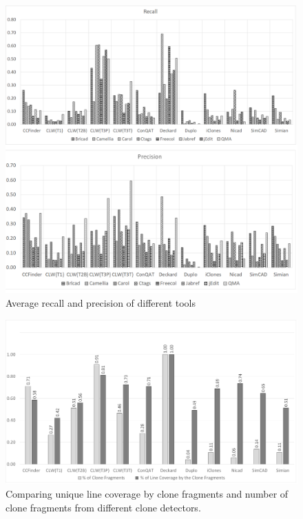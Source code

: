 \documentclass[review]{elsarticle}
\begin{document}
\begin{figure}
\centering
\includegraphics[width=\textwidth] {AveragePrecisionRecall.png}
\caption{Average recall and precision of different tools}
\label{fig:AveragePrecisionRecall}
\end{figure}


\vspace{2mm}
\begin{figure}
\centering
\includegraphics[width=\textwidth] {AverageLineCoveredPerSS.png}
\caption{Comparing unique line coverage by clone fragments and number of clone fragments from different clone detectors.}
\label{fig:AverageLineCoveredPerSS}
\end{figure}
\end{document}
